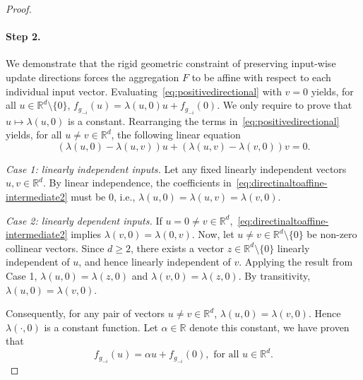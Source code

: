 \documentclass[10pt,a4paper]{amsart}
\newcommand{\R}{\mathbb{R}}
\begin{document}
\begin{proof}
    \paragraph{Step 2.} We demonstrate that the rigid geometric constraint of preserving input-wise update directions forces the aggregation $F$ to be affine with respect to each individual input vector.
    Evaluating~\eqref{eq:positivedirectional} with $v=0$ yields, for all $u \in \R^d \setminus \{0\}$, $f_{g_{-i}}(u) = \lambda(u, 0)u + f_{g_{-i}}(0)$. 
    We only require to prove that $u \mapsto \lambda(u, 0)$ is a constant. 
    Rearranging the terms in~\eqref{eq:positivedirectional} yields, for all $u \neq v \in \R^d$, the following linear equation
    \begin{equation}\label{eq:directinaltoaffine-intermediate2} 
        (\lambda(u,0) - \lambda(u,v))u + (\lambda(u,v) - \lambda(v,0))v = 0. 
    \end{equation}

    \textit{Case 1: linearly independent inputs.}
    Let any fixed linearly independent vectors $u, v \in \R^d$. 
    By linear independence, the coefficients in~\eqref{eq:directinaltoaffine-intermediate2} must be $0$, i.e., $\lambda(u,0) = \lambda(u,v) = \lambda(v,0)$.

    \textit{Case 2: linearly dependent inputs.}
    If $u = 0 \neq v \in \R^d$,~\eqref{eq:directinaltoaffine-intermediate2} implies $\lambda(v,0) = \lambda(0,v)$.
    Now, let $u \neq v \in \R^d \setminus \{0\}$ be non-zero collinear vectors. 
    Since $d \ge 2$, there exists a vector $z \in \R^d \setminus \{0\}$ linearly independent of $u$, and hence linearly independent of $v$.
    Applying the result from Case 1, $\lambda(u,0) = \lambda(z,0)$ and $\lambda(v,0) = \lambda(z,0)$.
    By transitivity, $\lambda(u,0) = \lambda(v,0)$.

    Consequently, for any pair of vectors $u \neq v \in \R^d $, $\lambda(u,0) = \lambda(v,0)$. 
    Hence $\lambda(\cdot, 0)$ is a constant function.
    Let $\alpha \in \R$ denote this constant, we have proven that 
    \begin{equation}\label{eq:indexaffine-intermediate}
        f_{g_{-i}}(u) = \alpha u + f_{g_{-i}}(0), \text{ for all } u\in\R^d.
    \end{equation}



\end{proof}
\end{document}

